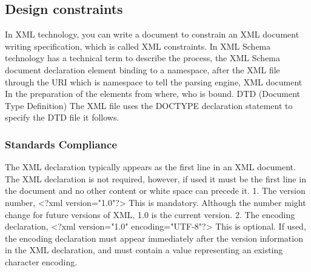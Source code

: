 
\subsection{Design constraints}

In XML technology, you can write a document to constrain an XML document writing specification, which is called XML constraints. In XML Schema technology has a technical term to describe the process, the XML Schema document declaration element binding to a namespace, after the XML file through the URI which is namespace to tell the parsing engine, XML document In the preparation of the elements from where, who is bound.
DTD (Document Type Definition)
The XML file uses the DOCTYPE declaration statement to specify the DTD file it follows.



\subsubsection{Standards Compliance}
The XML declaration typically appears as the first line in an XML document. The XML declaration is not required, however, if used it must be the first line in the document and no other content or white space can precede it.
1. The version number, <?xml version="1.0"?>
This is mandatory. Although the number might change for future versions of XML, 1.0 is the current version.
2. The encoding declaration, <?xml version="1.0" encoding="UTF-8"?>
This is optional. If used, the encoding declaration must appear immediately after the version information in the XML declaration, and must contain a value representing an existing character encoding.



